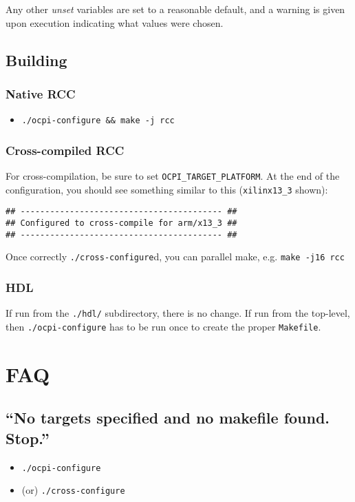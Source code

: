 \documentclass{article}
\begin{document}
Any other \textit{unset} variables are set to a reasonable default, and a warning is given upon execution indicating what values were chosen.

\subsection{Building}
\subsubsection{Native RCC}
\begin{itemize}
\item \verb+./ocpi-configure && make -j rcc+
\end{itemize}

\subsubsection{Cross-compiled RCC}
For cross-compilation, be sure to set \verb+OCPI_TARGET_PLATFORM+. At the end of the configuration, you should see something similar to this (\texttt{xilinx13\_3} shown):
\begin{lstlisting}
## ----------------------------------------- ##
## Configured to cross-compile for arm/x13_3 ##
## ----------------------------------------- ##
\end{lstlisting}

Once correctly \verb+./cross-configure+d, you can parallel make, e.g. \verb+make -j16 rcc+

\subsubsection{HDL}
If run from the \texttt{./hdl/} subdirectory, there is no change. If run from the top-level, then \verb+./ocpi-configure+ has to be run once to create the proper \texttt{Makefile}.

\section{FAQ}
\subsection{``No targets specified and no makefile found.  Stop.''}
\begin{itemize}
\item \verb+./ocpi-configure+
\item (or) \verb+./cross-configure+
\end{itemize}
\end{document}
